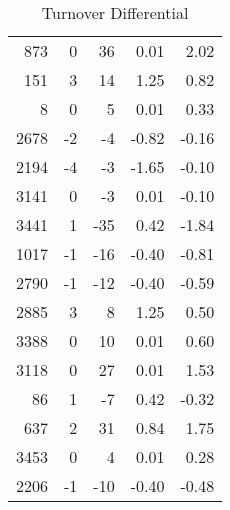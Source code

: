 \documentclass{exam}
\begin{document}
\begin{table}[H]
\begin{tabular}{rrrrr}
      873  & 0         & 36     & 0.01      & 2.02 \\
      151  & 3         & 14     & 1.25      & 0.82 \\
      8    & 0         & 5      & 0.01      & 0.33 \\
      2678 & -2        & -4     & -0.82     & -0.16 \\
      2194 & -4        & -3     & -1.65     & -0.10 \\
      3141 & 0         & -3     & 0.01      & -0.10 \\
      3441 & 1         & -35    & 0.42      & -1.84 \\
      1017 & -1        & -16    & -0.40     & -0.81 \\
      2790 & -1        & -12    & -0.40     & -0.59 \\
      2885 & 3         & 8      & 1.25      & 0.50 \\
      3388 & 0         & 10     & 0.01      & 0.60 \\
      3118 & 0         & 27     & 0.01      & 1.53 \\
      86   & 1         & -7     & 0.42      & -0.32 \\
      637  & 2         & 31     & 0.84      & 1.75 \\
      3453 & 0         & 4      & 0.01      & 0.28 \\
      2206 & -1        & -10    & -0.40     & -0.48 \\
      \bottomrule
    \end{tabular}
    \caption{Turnover Differential}
  \end{table}
\end{document}
